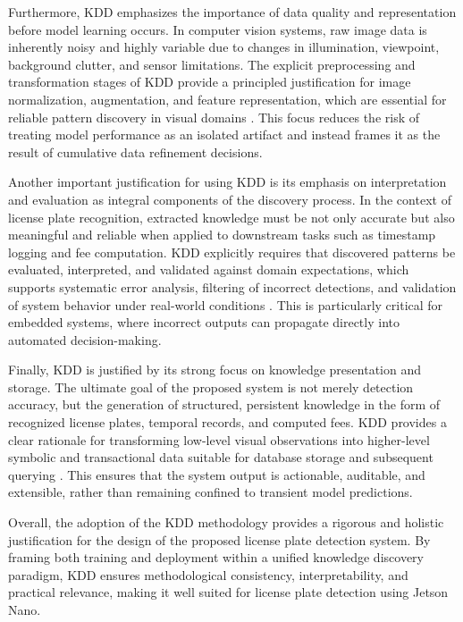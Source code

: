 \noindent
Furthermore, KDD emphasizes the importance of data quality and representation before model learning occurs. In computer vision systems, raw image data is inherently noisy and highly variable due to changes in illumination, viewpoint, background clutter, and sensor limitations. The explicit preprocessing and transformation stages of KDD provide a principled justification for image normalization, augmentation, and feature representation, which are essential for reliable pattern discovery in visual domains \cite{du2013automatic,lecun2015deep}. This focus reduces the risk of treating model performance as an isolated artifact and instead frames it as the result of cumulative data refinement decisions.\newline

\noindent
Another important justification for using KDD is its emphasis on interpretation and evaluation as integral components of the discovery process. In the context of license plate recognition, extracted knowledge must be not only accurate but also meaningful and reliable when applied to downstream tasks such as timestamp logging and fee computation. KDD explicitly requires that discovered patterns be evaluated, interpreted, and validated against domain expectations, which supports systematic error analysis, filtering of incorrect detections, and validation of system behavior under real-world conditions \cite{everingham2010pascal}. This is particularly critical for embedded systems, where incorrect outputs can propagate directly into automated decision-making.\newline

\noindent
Finally, KDD is justified by its strong focus on knowledge presentation and storage. The ultimate goal of the proposed system is not merely detection accuracy, but the generation of structured, persistent knowledge in the form of recognized license plates, temporal records, and computed fees. KDD provides a clear rationale for transforming low-level visual observations into higher-level symbolic and transactional data suitable for database storage and subsequent querying \cite{fayyad1996knowledge,han2011data}. This ensures that the system output is actionable, auditable, and extensible, rather than remaining confined to transient model predictions.\newline

\noindent
Overall, the adoption of the KDD methodology provides a rigorous and holistic justification for the design of the proposed license plate detection system. By framing both training and deployment within a unified knowledge discovery paradigm, KDD ensures methodological consistency, interpretability, and practical relevance, making it well suited for license plate detection using Jetson Nano.\newline